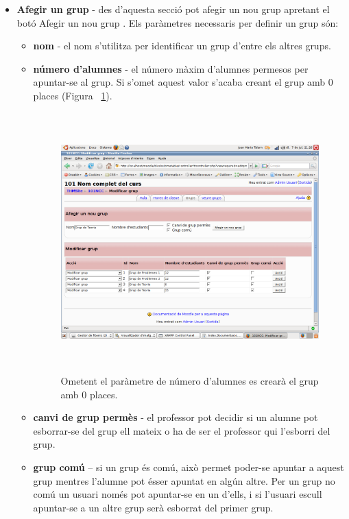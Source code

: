 \documentclass[a4paper]{report}  %
\begin{document}
\begin{itemize}
\item\textbf{Afegir un grup} - des d'aquesta secció pot afegir un nou grup apretant el botó Afegir un nou grup .
Els paràmetres necessaris per definir un grup són:
	\begin{itemize}
	\item\textbf{nom} - el nom s'utilitza per identificar un grup d'entre els altres grups.
	\item\textbf{número d'alumnes} - el número màxim d'alumnes permesos per apuntar-se al grup. Si s'omet aquest valor s'acaba creant el grup amb 0 places (Figura ~\ref{fig:EditantGrup0places}).
		\begin{figure}[H] %
		\begin{center}
		\includegraphics[height=10cm,width=12cm]{img/EditantGrup0places.png}
		\caption[List caption]{Ometent el paràmetre de número d'alumnes es crearà el grup amb 0 places.}
		\label{fig:EditantGrup0places}
		\end{center}
		\end{figure}
	\item\textbf{canvi de grup permès} - el professor pot decidir si un alumne pot esborrar-se del grup ell mateix o ha de ser el professor qui l'esborri del grup.
	\item\textbf{grup comú} – si un grup és comú, això permet poder-se apuntar a aquest grup mentres l'alumne pot ésser apuntat en algún altre.
	Per un grup no comú un usuari només pot apuntar-se en un d'ells, i si l'usuari escull apuntar-se a un altre grup serà esborrat del primer grup.
	\end{itemize}
	

\end{itemize}
\end{document}
